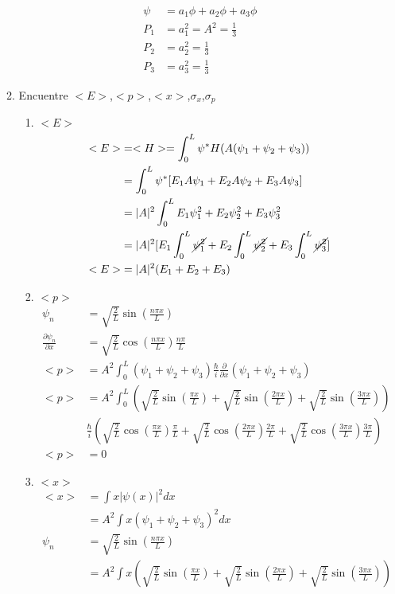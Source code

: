 \documentclass[12pt]{exam}
\begin{document}
\begin{enumerate}
\begin{enumerate}
			\begin{align*}
				\psi &= a_1\phi + a_2\phi + a_3\phi\\
				P_1 &= a_1^2 = A^2 = \frac{1}{3}\\
				P_2 &= a_2^2 = \frac{1}{3}\\
				P_3 &= a_3^2 = \frac{1}{3}
			\end{align*}
		\item Encuentre $<E>$,$<p>$,$<x>$,$\sigma_x$,$\sigma_p$
			\begin{enumerate}
				\item $<E>$
					\begin{align*}
						<E> &= <H> = \int_0^L \psi^*H(A(\psi_1 + \psi_2 + \psi_3))\\
						&= \int_0^L \psi^*[E_1A\psi_1 + E_2A\psi_2 + E_3A\psi_3]\\
						&= |A|^2 \int_0^L E_1\psi_1^2 + E_2\psi_2^2 + E_3\psi_3^2\\
						&= |A|^2 [E_1\int_0^L\cancel{\psi_1^2}+E_2\int_0^L\cancel{\psi_2^2}+E_3\int_0^L\cancel{\psi_3^2}]\\
						<E> &= |A|^2(E_1+E_2+E_3)
					\end{align*}
				\item $<p>$
					\begin{align*}
						\psi_n &= \sqrt{\frac{2}{L}}\sin\left(\frac{n\pi x}{L}\right)\\
						\frac{\partial \psi_n}{\partial x} &= \sqrt{\frac{2}{L}}\cos\left(\frac{n\pi x}{L}\right)\frac{n\pi}{L}\\
						<p> &= A^2 \int_0^L(\psi_1+\psi_2+\psi_3)\frac{\hbar}{i}\frac{\partial}{\partial x}(\psi_1+\psi_2+\psi_3)\\
						<p> &= A^2 \int_0^L\left(\sqrt{\frac{2}{L}}\sin\left(\frac{\pi x}{L}\right)+\sqrt{\frac{2}{L}}\sin\left(\frac{2\pi x}{L}\right)+\sqrt{\frac{2}{L}}\sin\left(\frac{3\pi x}{L}\right)\right)\\
						&\frac{\hbar}{i}\left(\sqrt{\frac{2}{L}}\cos\left(\frac{\pi x}{L}\right)\frac{\pi}{L}+ \sqrt{\frac{2}{L}}\cos\left(\frac{2\pi x}{L}\right)\frac{2\pi}{L}+ \sqrt{\frac{2}{L}}\cos\left(\frac{3\pi x}{L}\right)\frac{3\pi}{L}\right)\\
						<p> &= 0
					\end{align*}
				\item $<x>$
					\begin{align*}
            <x> &= \int x|\psi(x)|^2 dx\\
            &= A^2 \int x(\psi_1 + \psi_2 + \psi_3)^2 dx\\
            \psi_n &= \sqrt{\frac{2}{L}}\sin\left(\frac{n\pi x}{L}\right)\\
            &= A^2 \int x\left(\sqrt{\frac{2}{L}}\sin\left(\frac{\pi x}{L}\right) + \sqrt{\frac{2}{L}}\sin\left(\frac{2\pi x}{L}\right) + \sqrt{\frac{2}{L}}\sin\left(\frac{3\pi x}{L}\right)\right)
					\end{align*}
			\end{enumerate}
\end{enumerate}


\end{enumerate}



\end{document}
